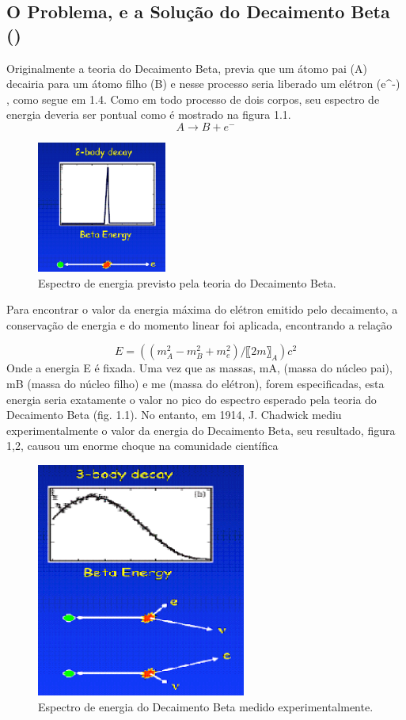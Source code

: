 \subsection{O Problema, e a Solução do Decaimento Beta (\beta)}
Originalmente a teoria do Decaimento Beta, previa que um átomo pai (A) decairia para um átomo filho (B) e nesse processo seria liberado um elétron (e^-) , como  segue  em 1.4.  Como  em  todo processo  de  dois corpos, seu espectro de energia deveria ser pontual como é mostrado na figura 1.1.
\begin{equation}
    A \rightarrow B + e^-
\end{equation}
\begin{figure}
    \centering
    \includegraphics{decaimentobeta2corpos.png}
    \caption{Espectro de energia previsto pela teoria do Decaimento Beta.}
    \label{fig:my_label}
\end{figure}
Para encontrar o valor da energia máxima do elétron emitido pelo decaimento, a conservação de energia e do momento linear foi aplicada, encontrando a relação 

\begin{equation}
    E = ((m_A^2-m_B^2+m_e^2)/〖2m〗_A )c^2
\end{equation}
Onde a energia E é fixada.
Uma vez que as massas, mA, (massa do núcleo pai), mB (massa do núcleo filho) e me (massa do elétron), forem especificadas, esta energia seria exatamente o valor no pico do espectro esperado pela teoria do Decaimento Beta (fig. 1.1). No entanto, em 1914, J. Chadwick mediu experimentalmente o valor da energia do Decaimento Beta, seu resultado, figura 1,2, causou um enorme choque na comunidade científica
\begin{figure}
    \centering
    \includegraphics{verdadeirodecaimentobeta.png}
    \caption{Espectro de energia do Decaimento Beta medido experimentalmente.}
    \label{fig:my_label}
\end{figure}

